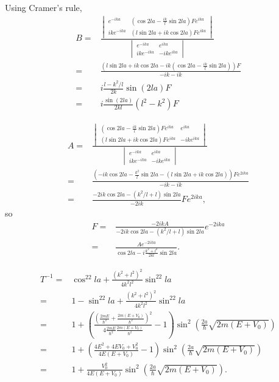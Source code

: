     Using Cramer's rule,
    \begin{align*}
        B = &
        \frac{
        \begin{vmatrix}
        e^{-ika} & (\cos 2la -\frac{ik}{l}\sin 2la)Fe^{ika} \\
        ike^{-ika} & (l\sin 2la +ik\cos2la)Fe^{ika} 
        \end{vmatrix}
        }{\begin{vmatrix}
        e^{-ika} & e^{ika}\\
        ike^{-ika} & -ike^{ika}
        \end{vmatrix}}\\
        = & 
        \frac{(l\sin 2la +ik\cos2la-ik(\cos2la - \frac{ik}{l}\sin2la)) F}{-ik-ik}\\
        =& 
        i\frac{l-k^2/l}{2k}\sin(2la) F\\
        =& i\frac{\sin(2la)}{2kl}(l^2-k^2)F
    \end{align*}

    
    \begin{align*}
        A = &
        \frac{
        \begin{vmatrix}
        (\cos 2la -\frac{ik}{l}\sin 2la)Fe^{ika} & e^{ika}\\
        (l\sin 2la +ik\cos2la)Fe^{ika} & -ike^{ika}
        \end{vmatrix}
        }{\begin{vmatrix}
        e^{-ika} & e^{ika}\\
        ike^{-ika} & -ike^{ika}
        \end{vmatrix}}\\
        = & 
        \frac{(-ik\cos 2la -\frac{k^2}{l}\sin 2la-(l\sin 2la +ik\cos2la)) Fe^{2ika}}{-ik-ik}\\
        =& 
        \frac{-2ik\cos2la -(k^2/l+l)\sin2la}
        {-2ik}
        Fe^{2ika},
    \end{align*}
    so 
    \begin{align*}
        F =&  \frac{-2ikA}{-2ik\cos2la -(k^2/l+l)\sin2la}e^{-2ika}\\
        = & \frac{Ae^{-2ika}}{\cos2la-i\frac{k^2+l^2}{2kl}\sin2la}.
    \end{align*}

    \begin{align*}
        T^{-1}
        = & 
        \cos^22la + \frac{(k^2+l^2)^2}{4k^2l^2}\sin^22la\\
        = & 
        1-\sin^22la + 
        \frac{(k^2+l^2)^2}{4k^2l^2}\sin^22la\\
        = & 
        1 + \left(\frac{(\frac{2mE}{\hbar^2}+\frac{2m(E+V_0)}{\hbar^2})^2}{4\frac{2mE}{\hbar^2}\frac{2m(E+V_0)}{\hbar^2}} - 1\right)\sin^2\left(\frac{2a}{\hbar}\sqrt{2m(E+V_0)}\right)\\
        =& 
        1 + \left(
        \frac{4E^2+4EV_0+V_0^2}
        {4E(E+V_0)} - 1\right)\sin^2\left(\frac{2a}{\hbar}\sqrt{2m(E+V_0)}\right)\\
        =& 
        1 +
        \frac{V_0^2}
        {4E(E+V_0)}
        \sin^2\left(\frac{2a}{\hbar}\sqrt{2m(E+V_0)}\right).
    \end{align*}
